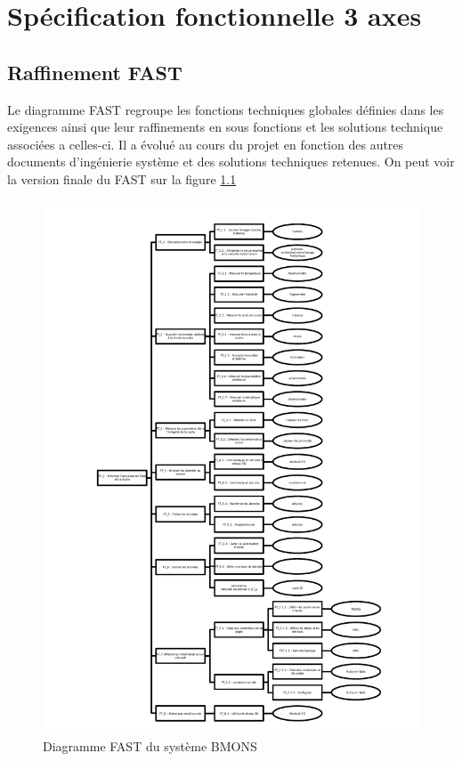 \chapter{Spécification fonctionnelle  3 axes}

\section{Raffinement FAST}
Le diagramme FAST regroupe les fonctions techniques globales définies dans les 
exigences ainsi que leur raffinements en sous fonctions et les solutions technique 
associées a celles-ci. Il a évolué au cours du projet en fonction des autres documents 
d'ingénierie système et des solutions techniques retenues. On peut voir la version finale du FAST sur la figure \ref{fig:fast}

\begin{figure}[h]
\centering\includegraphics[scale=0.7]{FAST_BMONS.pdf}
\caption{\label{fig:fast} Diagramme FAST du système BMONS}
\end{figure}


